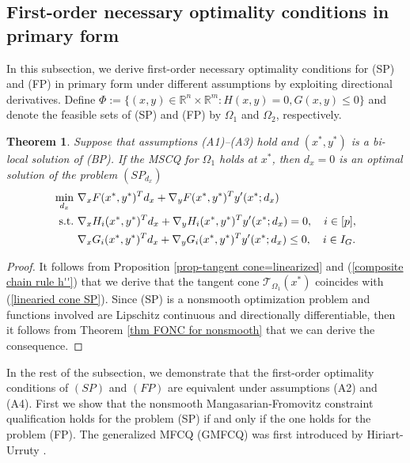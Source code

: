 \documentclass[11pt]{article}
\newtheorem{theorem}{Theorem}[section]
\theoremstyle{definition}
\theoremstyle{remark}
\numberwithin{equation}{section}
\begin{document}
\subsection{First-order necessary optimality conditions in primary form}\label{sec first-order optimality
condition by directional}

In this subsection, we derive first-order necessary optimality conditions  for (SP) and (FP) in primary form under different assumptions  by exploiting directional derivatives. Define $\Phi:=\{(x,y)\in \mathbb{R}^n \times \mathbb{R}^m:H(x,y)=0, G(x,y)\le0\}$ and denote the feasible sets of (SP) and (FP)  by $\Omega_1$ and $\Omega_2$, respectively.
\begin{theorem}\label{thm FONC for SP}
Suppose that assumptions  \textnormal{(A1)}--\textnormal{(A3)}  hold  and $(x^*,y^*)$ is a bi-local solution of (BP). If the MSCQ for $\Omega_1$ holds at $x^*$,
    then $d_x=0$ is an optimal solution of the problem $(SP_{d_x})$
       \begin{subequations}\label{linearied cone SP}
         \begin{align}
   \min_{d_x} ~ & \nabla_x F(x^*, y^*)^{T} d_x+\nabla_y F(x^*, y^*)^{T}y'(x^*;d_x)\notag\\
   {\rm s.t.}~&\nabla_x H_i(x^*, y^*)^{T} d_x+\nabla_y H_i(x^*, y^*)^{T} y'(x^*;d_x) = 0,
                  \quad  i\in[p], \\
        &\nabla_x G_i(x^*, y^*)^{T} d_x+\nabla_y G_i(x^*, y^*)^{T} y'(x^*;d_x)  \leq 0,
         \quad  i \in I_{G}.
   \end{align}
       \end{subequations}
\end{theorem}
\begin{proof}
It follows from Proposition \ref{prop-tangent cone=linearized} and (\ref{composite chain rule h''}) that we derive
that the tangent cone $\mathcal{T}_{\Omega_1}(x^*)$ coincides with (\ref{linearied cone SP}).
  Since (SP) is a nonsmooth optimization problem and functions involved are Lipschitz continuous and
  directionally differentiable, then it follows from Theorem \ref{thm FONC for nonsmooth} that we can derive the
  consequence.
\end{proof}

 In the rest of the subsection, we demonstrate that  the  first-order optimality conditions of $(SP)$ and $(FP)$ are equivalent under assumptions \textnormal{(A2)} and \textnormal{(A4)}. First we show that the nonsmooth Mangasarian-Fromovitz constraint qualification holds for the problem (SP) if and only if the one holds for the problem (FP). The generalized MFCQ (GMFCQ) was first introduced by Hiriart-Urruty \cite{Hiriart-Urruty}.
\end{document}

